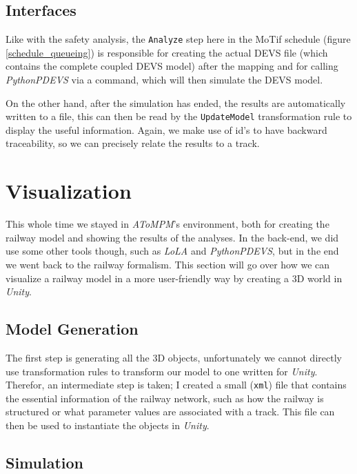 \documentclass{article}
\begin{document}
\subsection{Interfaces}

Like with the safety analysis, the \texttt{Analyze} step here in the MoTif schedule (figure \ref{schedule_queueing}) is responsible for creating the actual DEVS file (which contains the complete coupled DEVS model) after the mapping and for calling \textit{PythonPDEVS} via a command, which will then simulate the DEVS model.

On the other hand, after the simulation has ended, the results are automatically written to a file, this can then be read by the \texttt{UpdateModel} transformation rule to display the useful information. Again, we make use of id's to have backward traceability, so we can precisely relate the results to a track.

\section{Visualization}

This whole time we stayed in \textit{AToMPM}'s environment, both for creating the railway model and showing the results of the analyses. In the back-end, we did use some other tools though, such as \textit{LoLA} and \textit{PythonPDEVS}, but in the end we went back to the railway formalism. This section will go over how we can visualize a railway model in a more user-friendly way by creating a 3D world in \textit{Unity}.

\subsection{Model Generation}

The first step is generating all the 3D objects, unfortunately we cannot directly use transformation rules to transform our model to one written for \textit{Unity}. Therefor, an intermediate step is taken; I created a small (\texttt{xml}) file that contains the essential information of the railway network, such as how the railway is structured or what parameter values are associated with a track. This file can then be used to instantiate the objects in \textit{Unity}.

\subsection{Simulation}
\end{document}
